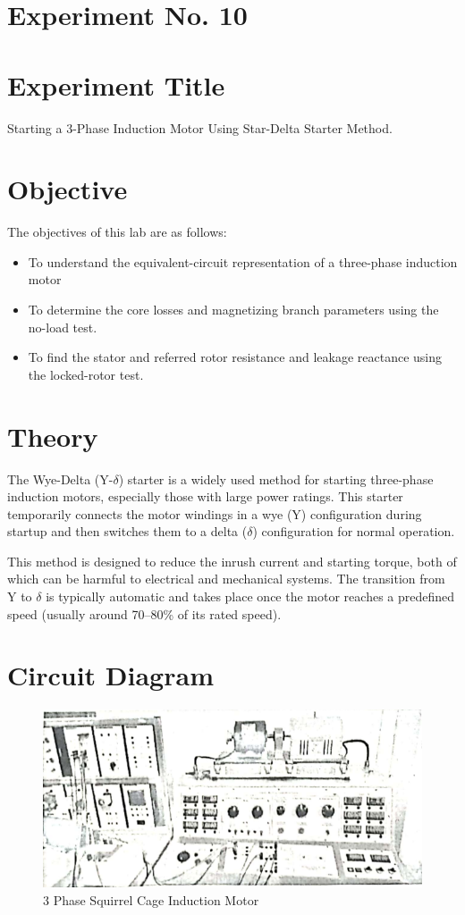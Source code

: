 \documentclass[a4paper,12pt]{article}
\begin{document}
	\section{Experiment No. 10}
	
	\section{Experiment Title }
	Starting a 3-Phase Induction Motor Using Star-Delta Starter Method.
	
	\section{Objective}
	
	The objectives of this lab are as follows:
	\begin{itemize}
		\item 	To understand the equivalent-circuit representation of a three-phase induction motor
		\item 	To determine the core losses and magnetizing branch parameters using the no-load test.
		
		\item  To find the stator and referred rotor resistance and leakage reactance using the locked-rotor
		test.
		
		
	\end{itemize}
	\section*{Theory}
	
	The Wye-Delta (Y-$\delta$) starter is a widely used method for starting three-phase induction motors, especially those with large power ratings. This starter temporarily connects the motor windings in a wye (Y) configuration during startup and then switches them to a delta ($\delta$) configuration for normal operation.
	
	This method is designed to reduce the inrush current and starting torque, both of which can be harmful to electrical and mechanical systems. The transition from Y to $\delta$ is typically automatic and takes place once the motor reaches a predefined speed (usually around 70--80\% of its rated speed).
		\section{Circuit Diagram}
	\begin{figure}[H]
		\centering
		\includegraphics[width=0.6\linewidth]{Images/1}
		\caption{3 Phase Squirrel Cage Induction Motor}
	\end{figure}
\end{document}
